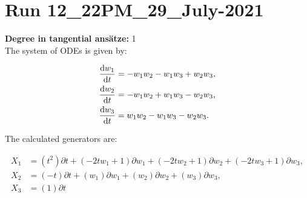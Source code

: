 \section*{Run 12\_22PM\_29\_July-2021}
\textbf{Degree in tangential ansätze:}	1\\
The system of ODEs is given by:

\begin{align*}
\dv{w_{1}}{t}&=- w_{1} w_{2} - w_{1} w_{3} + w_{2} w_{3},\\
\dv{w_{2}}{t}&=- w_{1} w_{2} + w_{1} w_{3} - w_{2} w_{3},\\
\dv{w_{3}}{t}&=w_{1} w_{2} - w_{1} w_{3} - w_{2} w_{3}.\\
\end{align*}

\noindent The calculated generators are:

\begin{align*}
X_{1}&=\left( t^{2} \right)\partial t+\left( - 2 t w_{1} + 1 \right)\partial w_{1}+\left( - 2 t w_{2} + 1 \right)\partial w_{2}+\left( - 2 t w_{3} + 1 \right)\partial w_{3},\\
X_{2}&=\left( - t \right)\partial t+\left( w_{1} \right)\partial w_{1}+\left( w_{2} \right)\partial w_{2}+\left( w_{3} \right)\partial w_{3},\\
X_{3}&=\left( 1 \right)\partial t\end{align*}
